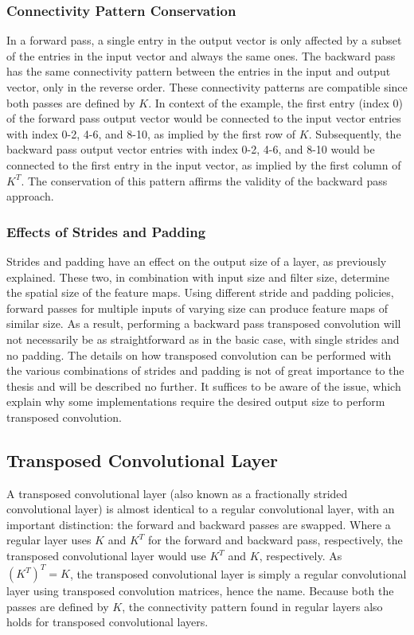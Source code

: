 \subsubsection{Connectivity Pattern Conservation}

In a forward pass, a single entry in the output vector is only affected by a subset of the entries in the input vector and always the same ones. The backward pass has the same connectivity pattern between the entries in the input and output vector, only in the reverse order. These connectivity patterns are compatible since both passes are defined by $K$. In context of the example, the first entry (index 0) of the forward pass output vector would be connected to the input vector entries with index 0-2, 4-6, and 8-10, as implied by the first row of $K$. Subsequently, the backward pass output vector entries with index 0-2, 4-6, and 8-10 would be connected to the first entry in the input vector, as implied by the first column of $K^T$. The conservation of this pattern affirms the validity of the backward pass approach.

\subsubsection{Effects of Strides and Padding}

Strides and padding have an effect on the output size of a layer, as previously explained. These two, in combination with input size and filter size, determine the spatial size of the feature maps. Using different stride and padding policies, forward passes for multiple inputs of varying size can produce feature maps of similar size. As a result, performing a backward pass transposed convolution will not necessarily be as straightforward as in the basic case, with single strides and no padding. The details on how transposed convolution can be performed with the various combinations of strides and padding is not of great importance to the thesis and will be described no further. It suffices to be aware of the issue, which explain why some implementations require the desired output size to perform transposed convolution.

\subsection{Transposed Convolutional Layer} \label{sec:trans-conv}

A transposed convolutional layer (also known as a fractionally strided convolutional layer) is almost identical to a regular convolutional layer, with an important distinction: the forward and backward passes are swapped. Where a regular layer uses $K$ and $K^T$ for the forward and backward pass, respectively, the transposed convolutional layer would use $K^T$ and $K$, respectively. As $(K^T)^T=K$, the transposed convolutional layer is simply a regular convolutional layer using transposed convolution matrices, hence the name. Because both the passes are defined by $K$, the connectivity pattern found in regular layers also holds for transposed convolutional layers. \\


